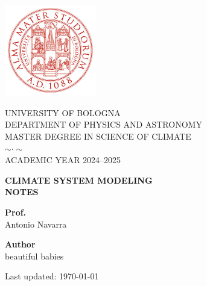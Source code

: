\pagestyle{empty}


\titleformat{\section}[block]{\centering\bfseries\Large}{}{0pt}{}


\begin{titlepage}

	\setlength{\parindent}{0pt}

	\begin{center}
		\includegraphics[width=0.3\textwidth]{impaginazione/logo_rosso} %
	\end{center}

	\begin{center}
		\Large UNIVERSITY OF BOLOGNA \\[0.5em]
		\large DEPARTMENT OF PHYSICS AND ASTRONOMY \\[0.5em]
		\large MASTER DEGREE IN SCIENCE OF CLIMATE \\[1em]
		$\sim \cdot \sim$ \\[1em]
		\large ACADEMIC YEAR 2024--2025
	\end{center}

	\vfill

	\begin{center}
		{\LARGE \textbf{CLIMATE SYSTEM MODELING}} \\[0.5em]
		{\LARGE \textbf{NOTES}}
	\end{center}

	\vfill

	\noindent
	\begin{minipage}[t]{0.48\textwidth}
		\raggedright
		\textbf{Prof.} \\
		Antonio Navarra
	\end{minipage}%
	\hfill
	\begin{minipage}[t]{0.48\textwidth}
		\raggedleft
		\textbf{Author} \\
		beautiful babies \\

	\end{minipage}


	\vfill

	\begin{center}
		Last updated:
		\today 
	\end{center}

	\restoregeometry

\end{titlepage}


\titleformat{\section}[block]{\normalfont\Large\bfseries}{\thesection}{1em}{}
